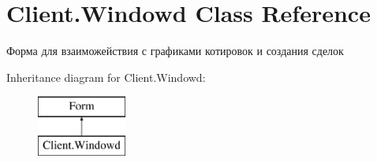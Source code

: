 \hypertarget{class_client_1_1_windowd}{}\section{Client.\+Windowd Class Reference}
\label{class_client_1_1_windowd}


Форма для взаиможействия с графиками котировок и создания сделок  


Inheritance diagram for Client.\+Windowd\+:\begin{figure}[H]
\begin{center}
\leavevmode
\includegraphics[height=2.000000cm]{class_client_1_1_windowd}
\end{center}
\end{figure}
